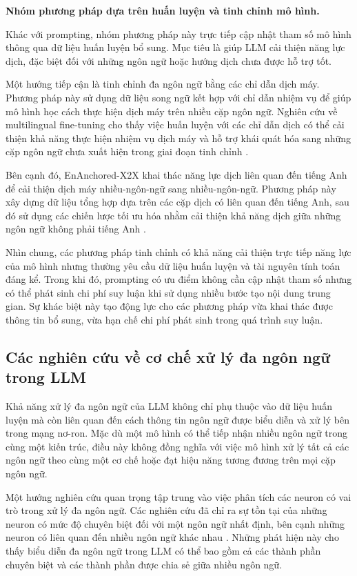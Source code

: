 \textbf{Nhóm phương pháp dựa trên huấn luyện và tinh chỉnh mô hình.}

Khác với prompting, nhóm phương pháp này trực tiếp cập nhật tham số mô hình thông qua dữ liệu huấn luyện bổ sung. Mục tiêu là giúp LLM cải thiện năng lực dịch, đặc biệt đối với những ngôn ngữ hoặc hướng dịch chưa được hỗ trợ tốt.

Một hướng tiếp cận là tinh chỉnh đa ngôn ngữ bằng các chỉ dẫn dịch máy. Phương pháp này sử dụng dữ liệu song ngữ kết hợp với chỉ dẫn nhiệm vụ để giúp mô hình học cách thực hiện dịch máy trên nhiều cặp ngôn ngữ. Nghiên cứu về multilingual fine-tuning cho thấy việc huấn luyện với các chỉ dẫn dịch có thể cải thiện khả năng thực hiện nhiệm vụ dịch máy và hỗ trợ khái quát hóa sang những cặp ngôn ngữ chưa xuất hiện trong giai đoạn tinh chỉnh \cite{li-etal-2024-eliciting}.

Bên cạnh đó, EnAnchored-X2X khai thác năng lực dịch liên quan đến tiếng Anh để cải thiện dịch máy nhiều-ngôn-ngữ sang nhiều-ngôn-ngữ. Phương pháp này xây dựng dữ liệu tổng hợp dựa trên các cặp dịch có liên quan đến tiếng Anh, sau đó sử dụng các chiến lược tối ưu hóa nhằm cải thiện khả năng dịch giữa những ngôn ngữ không phải tiếng Anh \cite{yang-etal-2025-enanchored}.

Nhìn chung, các phương pháp tinh chỉnh có khả năng cải thiện trực tiếp năng lực của mô hình nhưng thường yêu cầu dữ liệu huấn luyện và tài nguyên tính toán đáng kể. Trong khi đó, prompting có ưu điểm không cần cập nhật tham số nhưng có thể phát sinh chi phí suy luận khi sử dụng nhiều bước tạo nội dung trung gian. Sự khác biệt này tạo động lực cho các phương pháp vừa khai thác được thông tin bổ sung, vừa hạn chế chi phí phát sinh trong quá trình suy luận.

\subsection{Các nghiên cứu về cơ chế xử lý đa ngôn ngữ trong LLM}

Khả năng xử lý đa ngôn ngữ của LLM không chỉ phụ thuộc vào dữ liệu huấn luyện mà còn liên quan đến cách thông tin ngôn ngữ được biểu diễn và xử lý bên trong mạng nơ-ron. Mặc dù một mô hình có thể tiếp nhận nhiều ngôn ngữ trong cùng một kiến trúc, điều này không đồng nghĩa với việc mô hình xử lý tất cả các ngôn ngữ theo cùng một cơ chế hoặc đạt hiệu năng tương đương trên mọi cặp ngôn ngữ.

Một hướng nghiên cứu quan trọng tập trung vào việc phân tích các neuron có vai trò trong xử lý đa ngôn ngữ. Các nghiên cứu đã chỉ ra sự tồn tại của những neuron có mức độ chuyên biệt đối với một ngôn ngữ nhất định, bên cạnh những neuron có liên quan đến nhiều ngôn ngữ khác nhau \cite{tang-etal-2024-language}. Những phát hiện này cho thấy biểu diễn đa ngôn ngữ trong LLM có thể bao gồm cả các thành phần chuyên biệt và các thành phần được chia sẻ giữa nhiều ngôn ngữ.

